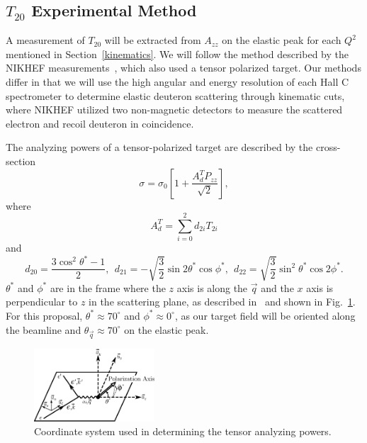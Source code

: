 \subsection{$T_{20}$ Experimental Method} %
\label{t20_exp}

A measurement of $T_{20}$ will be extracted from $A_{zz}$ on the elastic peak for each $Q^2$ mentioned in Section~\ref{kinematics}. We will follow the method described by the NIKHEF measurements~\cite{Bouwhuis:1998re}, which also used a tensor polarized target. Our methods differ in that we will use the high angular and energy resolution of each Hall C spectrometer to determine elastic deuteron scattering through kinematic cuts, where NIKHEF utilized two non-magnetic detectors to measure the scattered electron and recoil deuteron in coincidence. 

The analyzing powers of a tensor-polarized target are described by the cross-section
\begin{equation}
\sigma = \sigma_0\left[ 1 + \frac{A_d^T P_{zz}}{\sqrt{2}} \right],
\label{cs-ana}
\end{equation}
where
\begin{equation} A^T_d = \sum_{i=0}^{2}d_{2i}T_{2i}
\end{equation}
and
\begin{equation} d_{20} = \frac{3 \cos^2 \theta^* -1}{2},~~d_{21} = -\sqrt{\frac{3}{2}}\sin2\theta^*\cos\phi^*,~~d_{22}=\sqrt{\frac{3}{2}}\sin^2\theta^*\cos 2\phi^*.
\end{equation}
$\theta^*$ and $\phi^*$ are in the frame where the $z$ axis is along the $\vec{q}$ and the $x$ axis is perpendicular to $z$ in the scattering plane, as described in~\cite{Donnelly:1985ry} and shown in Fig.~\ref{coords}. For this proposal, $\theta^* \approx 70^{\circ}$ and $\phi^* \approx 0^{\circ}$, as our target field will be oriented along the beamline and $\theta_{\vec{q}}\approx 70^{\circ}$ on the elastic peak.

\begin{figure}
\begin{center}
\includegraphics[width=0.4\textwidth]{figs/coordinate_system.eps} 
\caption{\label{coords}Coordinate system used in determining the tensor analyzing powers.
}
\end{center}
\end{figure}

